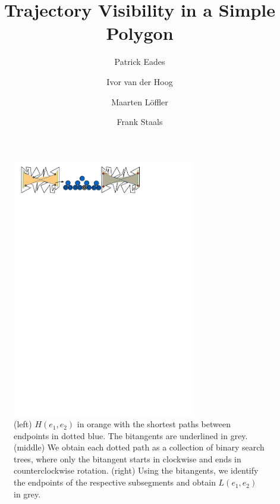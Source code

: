 \documentclass[a4paper, UKenglish]{lipics-v2018}
\title{Trajectory Visibility in a Simple Polygon}
\author{Patrick Eades}{University of Sydney}{patrick.eades@sydney.edu.au}{}{}
\author{Ivor van der Hoog}{Utrecht University}{i.d.vanderhoog@uu.nl}{}{}
\author{Maarten Löffler}{Utrecht University}{m.loffler@uu.nl}{}{}
\author{Frank Staals}{Utrecht University}{f.staals@uu.nl}{}{}
\begin{document}
\maketitle

\vspace{-6.5cm}
\begin{figure}
    \includegraphics[width=8cm]{../visibilityglass}
    \centering
    \caption{(left) $H(e_1,e_2)$ in orange with the shortest paths between endpoints in dotted blue. The bitangents are underlined in grey. (middle) We obtain each dotted path as a collection of binary search trees, where only the bitangent starts in clockwise and ends in counterclockwise rotation. (right) Using the bitangents, we identify the endpoints of the respective subsegments and obtain $L(e_1,e_2)$ in grey.}
    \label{fig:bitangent}
\end{figure}
~ \newline
\vspace{5.2cm}
\end{document}
